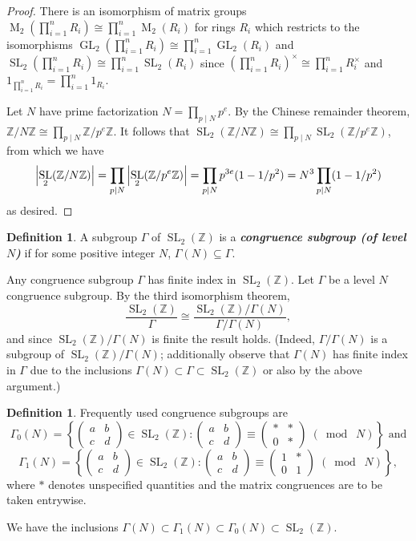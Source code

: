 \documentclass[10pt,leqno]{article}
\theoremstyle{plain}
\theoremstyle{definition}
\newtheorem{definition}[lem]{Definition}
\numberwithin{equation}{section}
\numberwithin{lem}{section}
\newcommand{\cbr}[1]{\left\{#1\right\}}
\newcommand{\textib}[1]{\textbf{\textit{#1}}}
\DeclareMathOperator{\Mat}{M}
\DeclareMathOperator{\GL}{GL}
\DeclareMathOperator{\SL}{SL}
\newcommand{\smod}[1]{\;(\bmod\; #1)}
\newcommand{\abcd}{\begin{pmatrix}
    a & b \\ c & d
\end{pmatrix}}
\newcommand{\slz}{\SL_2(\mathbb{Z})}
\begin{document}
\begin{proof}
    There is an isomorphism of matrix groups $\Mat_2(\prod_{i=1}^nR_i)\cong \prod_{i=1}^n\Mat_2(R_i)$ for rings $R_i$ which restricts to the isomorphisms $\GL_2(\prod_{i=1}^nR_i)\cong \prod_{i=1}^n\GL_2(R_i)$ and $\SL_2(\prod_{i=1}^nR_i)\cong \prod_{i=1}^n\SL_2(R_i)$ since $(\prod_{i=1}^nR_i)^\times\cong \prod_{i=1}^nR_i^\times$ and $1_{\prod_{i=1}^nR_i} = \prod_{i=1}^n1_{R_i}$.

    Let $N$ have prime factorization $N = \prod_{p\mid N} p^{e}$. By the Chinese remainder theorem, $\mathbb{Z}/N\mathbb{Z}\cong \prod_{p\mid N}\mathbb{Z}/p^{e}\mathbb{Z}$. It follows that $\SL_2(\mathbb{Z}/N\mathbb{Z})\cong \prod_{p\mid N}\SL_2(\mathbb{Z}/p^{e}\mathbb{Z})$, from which we have \[\abs{\SL_2(\mathbb{Z}/N\mathbb{Z})}= \prod_{p\mid N}\abs{\SL_2(\mathbb{Z}/p^{e}\mathbb{Z})} = \prod_{p\mid N}p^{3e}(1-1/p^2) = N^3\prod_{p\mid N}(1-1/p^2)\] as desired.
\end{proof}

\begin{definition}
    A subgroup $\varGamma$ of $\slz$ is a \textib{congruence subgroup (of level $N$)} if for some positive integer $N$, $\varGamma(N)\subseteq \varGamma$.
\end{definition}
Any congruence subgroup $\varGamma$ has finite index in $\slz$. Let $\varGamma$ be a level $N$ congruence subgroup. By the third isomorphism theorem,
\[\frac{\slz}{\varGamma}\cong \frac{\slz/\varGamma(N)}{\varGamma/\varGamma(N)},\] and since $\slz/\varGamma(N)$ is finite the result holds. (Indeed, $\varGamma/\varGamma(N)$ is a subgroup of $\slz/\varGamma(N)$; additionally observe that $\varGamma(N)$ has finite index in $\varGamma$ due to the inclusions $\varGamma(N)\subset \varGamma \subset \slz$ or also by the above argument.)

\begin{definition}
    Frequently used congruence subgroups are 
    \[\varGamma_0(N) = \cbr{\abcd\in\slz: \abcd\equiv\begin{pmatrix}
        \ast & \ast \\ 0 & \ast
    \end{pmatrix}\smod N}\text{ and}\]
    \[\varGamma_1(N) = \cbr{\abcd\in \slz: \begin{pmatrix}
        a & b \\ c & d 
    \end{pmatrix}\equiv \begin{pmatrix}
        1 & \ast \\ 0 & 1
    \end{pmatrix}\smod N},\] where $\ast$ denotes unspecified quantities and the matrix congruences are to be taken entrywise.    
\end{definition}
We have the inclusions $\varGamma(N)\subset\varGamma_1(N)\subset\varGamma_0(N)\subset\slz$.
\end{document}
